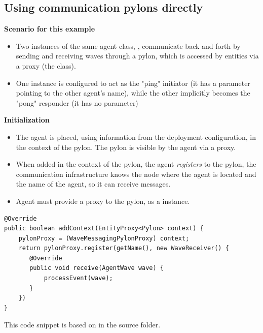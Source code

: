 \documentclass[10pt,aspectratio=169]{beamer}
\begin{document}
\subsection{Using communication pylons directly}

\begin{frame}

\textbf{Scenario for this example}

\begin{itemize}
    \item Two instances of the same agent class, , communicate back and forth by sending and receiving waves through a pylon, which is accessed by entities via a proxy (the  class).
    \item One instance is configured to act as the "ping" initiator (it has a  parameter pointing to the other agent’s name), while the other implicitly becomes the "pong" responder (it has no  parameter)
\end{itemize}

\end{frame}

\begin{frame}[fragile]

\textbf{Initialization}

\begin{itemize}
    \item The agent is placed, using information from the deployment configuration, in the context of the pylon. The pylon is visible by the agent via a proxy.
    \item When added in the context of the pylon, the agent \emph{registers} to the pylon, the communication infrastructure knows the node where the agent is located and the name of the agent, so it can receive messages.
    \item Agent must provide a proxy to the pylon, as a  instance.
\end{itemize}

\begin{lstlisting}
@Override
public boolean addContext(EntityProxy<Pylon> context) {
    pylonProxy = (WaveMessagingPylonProxy) context;
    return pylonProxy.register(getName(), new WaveReceiver() {
	   @Override
	   public void receive(AgentWave wave) {
		   processEvent(wave);
	   }
    })
}
\end{lstlisting}

{\small This code snippet is based on  in the  source folder.}






\end{frame}
\end{document}
